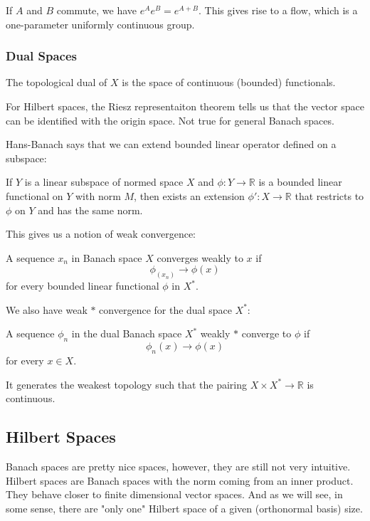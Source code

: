 \documentclass[main.tex]{subfiles}
\begin{document}
If $A$ and $B$ commute, we have $e^A e^B = e^{A + B}$. This gives rise to a flow, which is a one-parameter uniformly continuous group. 


\subsubsection{Dual Spaces}
The topological dual of $X$ is the space of continuous (bounded) functionals.

For Hilbert spaces, the Riesz representaiton theorem tells us that the vector space can be identified with the origin space. Not true for general Banach spaces.

Hans-Banach says that we can extend bounded linear operator defined on a subspace:

\begin{theorem}
If $Y$ is a linear subspace of normed space $X$ and $\phi: Y \rightarrow \mathbb{R}$ is a bounded linear functional on $Y$ with norm $M$, then exists an extension $\phi': X \rightarrow \mathbb{R}$ that restricts to $\phi$ on $Y$ and has the same norm.
\end{theorem}

This gives us a notion of weak convergence:
\begin{definition}
A sequence $x_n$ in Banach space $X$ converges weakly to $x$ if 
$$
\phi_(x_n) \rightarrow \phi(x)
$$
for every bounded linear functional $\phi$ in $X^*$.
\end{definition}

We also have weak $*$ convergence for the dual space $X^*$:
\begin{definition}
A sequence $\phi_n$ in the dual Banach space $X^*$ weakly $*$ converge to $\phi$ if
$$
\phi_n(x) \rightarrow \phi(x)
$$
for every $x \in X$.
\end{definition}
It generates the weakest topology such that the pairing $X \times X^* \rightarrow \mathbb{R}$ is continuous.



\subsection{Hilbert Spaces}
Banach spaces are pretty nice spaces, however, they are still not very intuitive. Hilbert spaces are Banach spaces with the norm coming from an inner product. They behave closer to finite dimensional vector spaces. And as we will see, in some sense, there are "only one" Hilbert space of a given (orthonormal basis) size.
\end{document}
